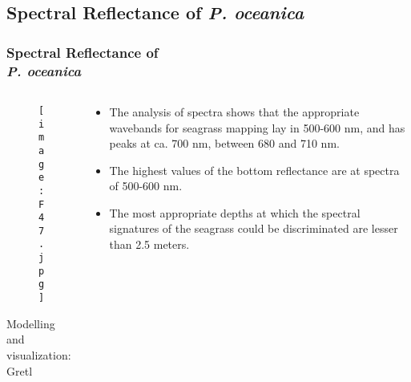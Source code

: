 \documentclass[pdflatex,compress,9pt,
	xcolor={dvipsnames,dvipsnames,svgnames,x11names,table},
	hyperref={colorlinks = true,breaklinks = true, urlcolor = NavyBlue, breaklinks = true}]{beamer}
\begin{document}
\subsection{Spectral Reflectance of \emph{P. oceanica}}
\begin{frame}\frametitle{Spectral Reflectance of \\\emph{P. oceanica}}
\begin{minipage}[0.4\textheight]{\textwidth}
\begin{columns}[T]
\begin{column}{0.6\textwidth}
\begin{figure}[H]
	\centering
		\texttt{[image: F47.jpg]}
\end{figure}
\scriptsize{Modelling and visualization: Gretl}
\end{column}
\begin{column}{0.4\textwidth}
\vspace{1em} 
\small{\begin{itemize}
	\item The analysis of spectra shows that the appropriate wavebands for seagrass mapping lay in 500-600 nm, and has  peaks at ca. 700 nm, between 680 and 710 nm.
	\item The highest values of the bottom reflectance are at spectra of 500-600 nm.
	\item The most appropriate depths at which the spectral signatures of the seagrass could be discriminated are lesser than 2.5 meters.
\end{itemize}}
\end{column}
\end{columns}
\end{minipage}
\end{frame}
\end{document}
